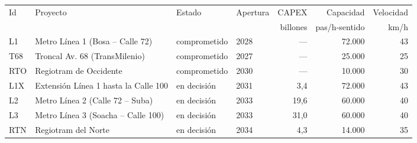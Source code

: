 \begin{tabular}{llllrrr}
\toprule
Id & Proyecto & Estado & Apertura & CAPEX & Capacidad & Velocidad \\
 & & & & billones & pas/h-sentido & km/h \\
\midrule
L1 & Metro Línea 1 (Bosa – Calle 72) & comprometido & 2028 & — & 72.000 & 43 \\
T68 & Troncal Av. 68 (TransMilenio) & comprometido & 2027 & — & 25.000 & 25 \\
RTO & Regiotram de Occidente & comprometido & 2030 & — & 10.000 & 30 \\
L1X & Extensión Línea 1 hasta la Calle 100 & en decisión & 2031 & 3,4 & 72.000 & 43 \\
L2 & Metro Línea 2 (Calle 72 – Suba) & en decisión & 2033 & 19,6 & 60.000 & 40 \\
L3 & Metro Línea 3 (Soacha – Calle 100) & en decisión & 2033 & 31,0 & 60.000 & 40 \\
RTN & Regiotram del Norte & en decisión & 2034 & 4,3 & 14.000 & 35 \\
\bottomrule
\end{tabular}
